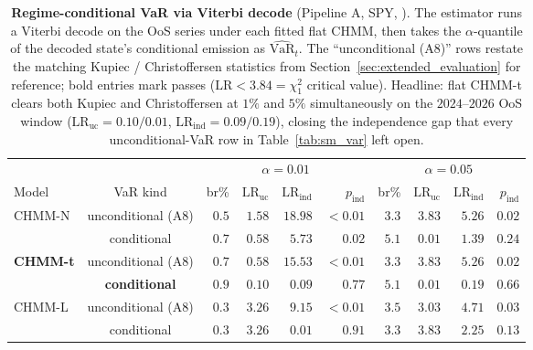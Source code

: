 \begin{table}[t]
\centering
\small
\caption{\textbf{Regime-conditional VaR via Viterbi decode} (Pipeline A, SPY, ). The estimator runs a Viterbi decode on the OoS series under each fitted flat CHMM, then takes the $\alpha$-quantile of the decoded state's conditional emission as $\widehat{\mathrm{VaR}}_t$. The ``unconditional (A8)'' rows restate the matching Kupiec / Christoffersen statistics from Section~\ref{sec:extended_evaluation} for reference; bold entries mark passes ($\text{LR} < 3.84 = \chi^2_1$ critical value). Headline: flat CHMM-t clears both Kupiec and Christoffersen at $1\%$ and $5\%$ simultaneously on the $2024$--$2026$ OoS window ($\text{LR}_{\text{uc}} = 0.10 / 0.01$, $\text{LR}_{\text{ind}} = 0.09 / 0.19$), closing the independence gap that every unconditional-VaR row in Table~\ref{tab:sm_var} left open.}
\label{tab:conditional_var}
\begin{tabular}{lcrrrr|rrrr}
\toprule
 & & \multicolumn{4}{c}{$\alpha = 0.01$} & \multicolumn{4}{c}{$\alpha = 0.05$} \\
Model & VaR kind & br\% & $\text{LR}_{\text{uc}}$ & $\text{LR}_{\text{ind}}$ & $p_{\text{ind}}$ & br\% & $\text{LR}_{\text{uc}}$ & $\text{LR}_{\text{ind}}$ & $p_{\text{ind}}$ \\
\midrule
\multirow{2}{*}{CHMM-N} & unconditional (A8) & $0.5$ & $1.58$ & $18.98$ & $< 0.01$ & $3.3$ & $3.83$ & $5.26$ & $0.02$ \\
                        & conditional        & $0.7$ & $\mathbf{0.58}$ & $5.73$ & $0.02$ & $5.1$ & $\mathbf{0.01}$ & $\mathbf{1.39}$ & $0.24$ \\
\multirow{2}{*}{\textbf{CHMM-t}} & unconditional (A8) & $0.7$ & $0.58$ & $15.53$ & $< 0.01$ & $3.3$ & $3.83$ & $5.26$ & $0.02$ \\
                        & \textbf{conditional} & $\mathbf{0.9}$ & $\mathbf{0.10}$ & $\mathbf{0.09}$ & $\mathbf{0.77}$ & $\mathbf{5.1}$ & $\mathbf{0.01}$ & $\mathbf{0.19}$ & $\mathbf{0.66}$ \\
\multirow{2}{*}{CHMM-L} & unconditional (A8) & $0.3$ & $3.26$ & $9.15$ & $< 0.01$ & $3.5$ & $3.03$ & $4.71$ & $0.03$ \\
                        & conditional        & $0.3$ & $3.26$ & $\mathbf{0.01}$ & $\mathbf{0.91}$ & $3.3$ & $3.83$ & $\mathbf{2.25}$ & $0.13$ \\
\bottomrule
\end{tabular}
\end{table}

